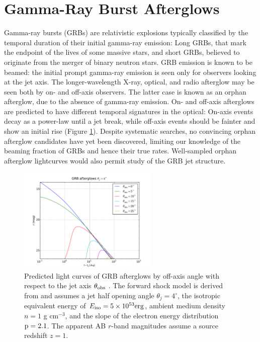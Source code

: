 %
%

\section{Gamma-Ray Burst Afterglows}
\def\secname{grbs}\label{sec:\secname}


Gamma-ray bursts (GRBs) are relativistic explosions typically classified
by the temporal duration of their initial gamma-ray emission: Long GRBs,
that mark the endpoint of the lives of some massive stars, and short
GRBs, believed to originate from the merger of binary neutron stars. GRB
emission is known to be beamed: the initial prompt gamma-ray emission is
seen only for observers looking at the jet axis. The longer-wavelength
X-ray, optical, and radio afterglow may be seen both by on- and off-axis
observers.  The latter case is known as an orphan afterglow, due to the
absence of gamma-ray emission. On- and off-axis afterglows are predicted
to have different temporal signatures in the optical: On-axis events
decay as a power-law until a jet break, while off-axis events should be
fainter and show an initial rise (Figure \ref{fig:afterglow_lcs}).
Despite systematic searches, no convincing orphan afterglow candidates
have yet been discovered, limiting our knowledge of the beaming fraction
of GRBs and hence their true rates. Well-sampled orphan afterglow
lightcurves would also permit study of the GRB jet structure.

\begin{figure}[hbt]
\centerline{
\includegraphics[width=0.6\textwidth]{figs/transients/predicted_afterglow_lcs_mag.pdf}
}
\caption{ Predicted light curves of GRB afterglows by off-axis angle
with respect to the jet axis $\theta_{\rm obs}$ \citep[Figure
8.8,][]{2009arXiv0912.0201L}. The forward shock model is derived from
\citet{2002ApJ...576..120T} and assumes a jet half opening angle
$\theta_j = 4^\circ$, the isotropic equivalent energy of $E_{\rm iso} =
5\times10^{53} \rm erg$, ambient medium density $n = 1$ g cm$^{-3}$, and
the slope of the electron energy distribution $\rm p = 2.1$. The
apparent AB $r$-band magnitudes assume a source redshift $z = 1$. }
\label{fig:afterglow_lcs}
\end{figure}


